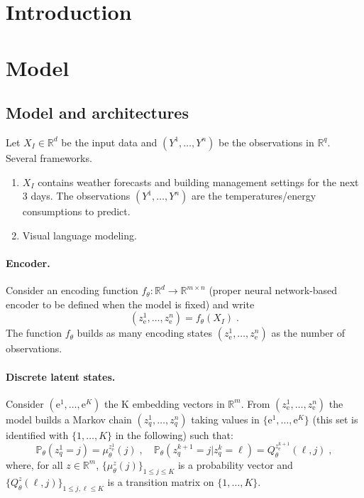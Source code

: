 \documentclass{article}
\title{}
\date{}
\author[$\dag$]{XXX}
\affil[$\dag$]{{\small CMAP, \'Ecole Polytechnique, Institut Polytechnique de Paris, Palaiseau.}}
\newcommand{\rset}{\ensuremath{\mathbb{R}}}
\newcommand{\eqsp}{\;}
\newcommand{\rme}{\mathrm{e}}
\begin{document}
\maketitle

\begin{abstract}

\end{abstract}


\section{Introduction}
\label{sec:intro}



\section{Model}
\label{sec:model}
\subsection{Model and architectures}
Let $X_I \in \rset^d$ be the input data and $(Y^1,\ldots,Y^n)$ be the observations in $\rset^q$.  Several frameworks.
\begin{enumerate}
\item $X_I$ contains weather forecasts and building management settings for the next 3 days. The observations $(Y^1,\ldots,Y^n)$  are the temperatures/energy consumptions to predict.
\item Visual language modeling. 
\end{enumerate}

\paragraph{Encoder.} Consider an encoding function $f_\theta: \rset^d \to \rset^{m\times n}$ (proper neural network-based encoder  to be defined when the model is fixed) and write
$$
(z_\rme^1,\ldots, z_\rme^n) = f_\theta(X_I)\eqsp.
$$
The function $f_\theta$ builds as many encoding states $(z_\rme^1,\ldots, z_\rme^n)$ as the number of observations. 

\paragraph{Discrete latent states.} Consider $(\rme^1,\ldots,\rme^K)$ the K embedding vectors in $\rset^m$. From $(z_\rme^1,\ldots, z_\rme^n)$ the model builds a Markov chain $(z_q^1,\ldots, z_q^n)$ taking values in $\{\rme^1,\ldots,\rme^K\}$ (this set is identified with $\{1,\ldots, K\}$ in the following)  such that:
$$
\mathbb{P}_\theta(z_q^1 = j) = \mu^{z_\rme^1}_{\theta}(j) \eqsp,\quad \mathbb{P}_\theta(z_q^{k+1} = j | z_q^{k} =  \ell) = Q^{z_\rme^{k+1}}_{\theta}(\ell,j)\eqsp, 
$$
where, for all $z\in\rset^m$, $\{\mu^z_{\theta}(j)\}_{1\leqslant j\leqslant K}$ is a probability vector and $\{Q^{z}_{\theta}(\ell,j)\}_{1\leqslant j,\ell\leqslant K}$ is a transition matrix on $\{1,\ldots, K\}$.
\end{document}
